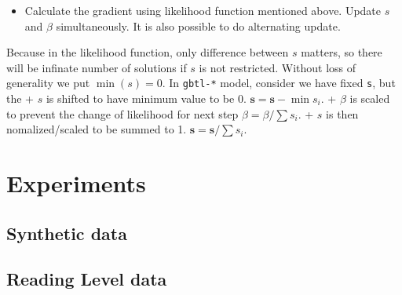\documentclass[]{article}
\providecommand{\tightlist}{%
  \setlength{\itemsep}{0pt}\setlength{\parskip}{0pt}}
\begin{document}
\begin{itemize}
\tightlist
\item
  Calculate the gradient using likelihood function mentioned above.
  Update \(s\) and \(\beta\) simultaneously. It is also possible to do
  alternating update.
\end{itemize}

Because in the likelihood function, only difference between \(s\)
matters, so there will be infinate number of solutions if \(s\) is not
restricted. Without loss of generality we put \(\min(s) = 0\). In
\texttt{gbtl-*} model, consider we have fixed \texttt{s}, but the +
\(s\) is shifted to have minimum value to be 0.
\(\mathbf{s} = \mathbf{s} - \min{s_i}\). + \(\beta\) is scaled to
prevent the change of likelihood for next step
\(\beta = \beta / \sum{s_i}\). + \(s\) is then nomalized/scaled to be
summed to 1. \(\mathbf{s} = \mathbf{s} / \sum{s_i}\).

\hypertarget{experiments}{%
\section{Experiments}\label{experiments}}

\hypertarget{synthetic-data}{%
\subsection{Synthetic data}\label{synthetic-data}}

\hypertarget{reading-level-data}{%
\subsection{Reading Level data}\label{reading-level-data}}
\end{document}
